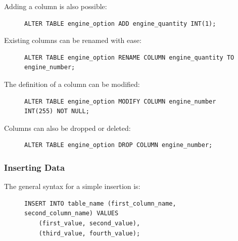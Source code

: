 \documentclass[10pt]{article}
\begin{document}
Adding a column is also possible:

\begin{figure}[H]
\begin{verbatim}
ALTER TABLE engine_option ADD engine_quantity INT(1);
\end{verbatim}
\end{figure}

Existing columns can be renamed with ease:

\begin{figure}[H]
\begin{verbatim}
ALTER TABLE engine_option RENAME COLUMN engine_quantity TO engine_number;
\end{verbatim}
\end{figure}

The definition of a column can be modified:

\begin{figure}[H]
\begin{verbatim}
ALTER TABLE engine_option MODIFY COLUMN engine_number INT(255) NOT NULL;
\end{verbatim}
\end{figure}

Columns can also be dropped or deleted:

\begin{figure}[H]
\begin{verbatim}
ALTER TABLE engine_option DROP COLUMN engine_number;
\end{verbatim}
\end{figure}

\subsubsection{Inserting Data}
\label{sec:org55663d9}

The general syntax for a simple insertion is:

\begin{figure}[H]
\begin{verbatim}
INSERT INTO table_name (first_column_name, second_column_name) VALUES
    (first_value, second_value),
    (third_value, fourth_value);
\end{verbatim}
\end{figure}
\end{document}
